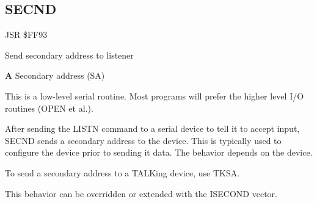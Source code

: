 \subsection{SECND}
\label{KERNAL Jump Table!SECND}
\begin{description}[leftmargin=2cm,style=nextline]
    \item [Address:] JSR \$FF93
    \item [Description:] Send secondary address to listener
    \item [Inputs:]
        \textbf{A} Secondary address (SA)
    \item [Remarks:]
        This is a low-level serial routine. Most programs will prefer the higher level I/O routines (OPEN et al.).

        After sending the LISTN command to a serial device to tell it to accept input, SECND sends a secondary address to the device. This is typically used to configure the device prior to sending it data. The behavior depends on the device.

        To send a secondary address to a TALKing device, use TKSA.

        This behavior can be overridden or extended with the ISECOND vector.
    \item [Example:]
\end{description}



\newpage
